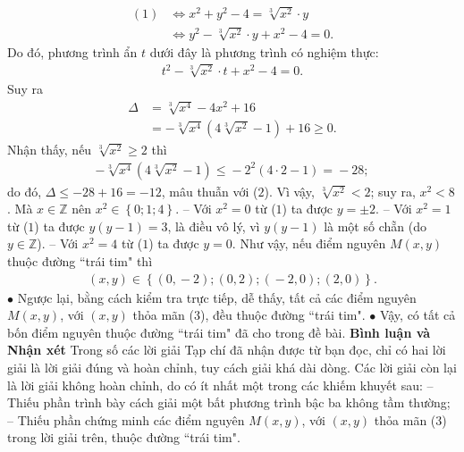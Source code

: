 \begin{multicols}{2}
\begin{align*}
		(1) &\Leftrightarrow {x^2} + {y^2} - 4 = \sqrt[3]{{{x^2}}} \cdot y\\ &\Leftrightarrow {y^2} - \sqrt[3]{{{x^2}}} \cdot y + {x^2} - 4 = 0.
	\end{align*}
	Do đó, phương trình ẩn $t$ dưới đây là phương trình có nghiệm thực:
	\begin{align*}
		{t^2} - \sqrt[3]{{{x^2}}} \cdot t + {x^2} - 4 = 0.
	\end{align*}
	Suy ra
	\begin{align*}
		\Delta  &= \sqrt[3]{{{x^4}}} - 4{x^2} + 16 \\
		&=  - \sqrt[3]{{{x^4}}}\left( {4\sqrt[3]{{{x^2}}} - 1} \right) + 16 \ge 0. \tag{$2$}
	\end{align*}
	Nhận thấy, nếu $\sqrt[3]{{{x^2}}} \ge 2$  thì
	\begin{align*}
		-\! \sqrt[3]{{{x^4}}}\left( {4\sqrt[3]{{{x^2}}} \!-\! 1} \right) \le  \!-\! {2^2}\left( {4 \cdot 2 \!-\! 1} \right) =  \!-\! 28;
	\end{align*}
	do đó, $\Delta \le - 28 + 16 = -12$, mâu thuẫn với ($2$).
	\vskip 0.05cm
	Vì vậy, $\sqrt[3]{{{x^2}}} < 2$; suy ra, $x^2 < 8$. Mà $x \in \mathbb{Z}$ nên ${x^2} \in \left\{ {0;1;4} \right\}$.
	\vskip 0.05cm 
	-- Với $x^2 = 0$  từ ($1$) ta được $y = \pm 2$.
	\vskip 0.05cm 
	-- Với $x^2 = 1$  từ ($1$) ta được $y (y-1) = 3$,  là điều vô lý, vì $y(y-1)$  là một số chẵn (do  $y \in \mathbb{Z}$).
	\vskip 0.05cm
	-- Với $x^2 = 4$  từ ($1$) ta được $y = 0$.
	\vskip 0.05cm
	Như vậy, nếu điểm nguyên $M(x, y)$ thuộc đường ``trái tim" thì
	\begin{align*}
		\left( {x,y} \right) \!\in\! \left\{\! {\left( {0, \!-\! 2} \right)\!;\!\left( {0,2} \right)\!;\!\left( { \!-\! 2,0} \right)\!;\!\left( {2,0} \right)} \!\right\}. \tag{$3$}
	\end{align*}
	$\bullet$ Ngược lại, bằng cách kiểm tra trực tiếp, dễ thấy, tất cả các điểm nguyên $M(x, y)$, với $(x, y)$ thỏa mãn ($3$), đều thuộc đường ``trái tim".
	\vskip 0.05cm
	$\bullet$ Vậy, có tất cả bốn điểm nguyên thuộc đường ``trái tim" đã cho trong đề bài.
	\vskip 0.05cm
	\textbf{\color{thachthuctoanhoc}Bình luận và Nhận xét}
	\vskip 0.05cm
	Trong số các lời giải Tạp chí đã nhận được từ bạn đọc, chỉ có hai lời giải là lời giải đúng và hoàn chỉnh, tuy cách giải khá dài dòng. Các lời giải còn lại là lời giải không hoàn chỉnh, do có ít nhất một trong các khiếm khuyết sau:
	\vskip 0.05cm
	-- Thiếu phần trình bày cách giải một bất phương trình bậc ba không tầm thường;
	\vskip 0.05cm
	-- Thiếu phần chứng minh các điểm nguyên $M(x, y)$, với $(x, y)$ thỏa mãn ($3$) trong lời giải trên, thuộc đường ``trái tim".

\end{multicols}
